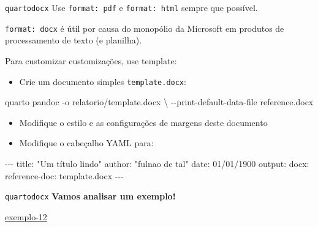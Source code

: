 \documentclass[
  10pt,
  ignorenonframetext,
]{beamer}
\newenvironment{Shaded}{\begin{snugshade}}{\end{snugshade}}
\newcommand{\AttributeTok}[1]{\textcolor[rgb]{0.40,0.45,0.13}{#1}}
\newcommand{\DataTypeTok}[1]{\textcolor[rgb]{0.68,0.00,0.00}{#1}}
\newcommand{\ExtensionTok}[1]{\textcolor[rgb]{0.00,0.23,0.31}{#1}}
\newcommand{\FunctionTok}[1]{\textcolor[rgb]{0.28,0.35,0.67}{#1}}
\newcommand{\KeywordTok}[1]{\textcolor[rgb]{0.00,0.23,0.31}{#1}}
\newcommand{\NormalTok}[1]{\textcolor[rgb]{0.00,0.23,0.31}{#1}}
\newcommand{\PreprocessorTok}[1]{\textcolor[rgb]{0.68,0.00,0.00}{#1}}
\newcommand{\StringTok}[1]{\textcolor[rgb]{0.13,0.47,0.30}{#1}}
\providecommand{\tightlist}{%
  \setlength{\itemsep}{0pt}\setlength{\parskip}{0pt}}\usepackage{longtable,booktabs,array}
\begin{document}
\begin{frame}[fragile]{\texttt{quarto}\newline \texttt{docx}}
\protect\hypertarget{quartodocx}{}
Use \texttt{format:\ pdf} e \texttt{format:\ html} sempre que possível.

\texttt{format:\ docx} é útil por causa do monopólio da Microsoft em
produtos de processamento de texto (e planilha).

Para customizar customizações, use template:

\begin{itemize}
\tightlist
\item
  Crie um documento simples \texttt{template.docx}:
\end{itemize}

\begin{Shaded}
\begin{Highlighting}[]
\ExtensionTok{quarto}\NormalTok{ pandoc }\AttributeTok{{-}o}\NormalTok{ relatorio/template.docx }\DataTypeTok{\textbackslash{}}
   \AttributeTok{{-}{-}print{-}default{-}data{-}file}\NormalTok{ reference.docx}
\end{Highlighting}
\end{Shaded}

\begin{itemize}
\tightlist
\item
  Modifique o estilo e as configurações de margens deste documento
\item
  Modifique o cabeçalho YAML para:
\end{itemize}
\end{frame}

\begin{frame}[fragile]
\begin{Shaded}
\begin{Highlighting}[]
\PreprocessorTok{{-}{-}{-}}
\FunctionTok{title}\KeywordTok{:}\AttributeTok{ }\StringTok{"Um título lindo"}
\FunctionTok{author}\KeywordTok{:}\AttributeTok{ }\StringTok{"fulnao de tal"}
\FunctionTok{date}\KeywordTok{:}\AttributeTok{ 01/01/1900}
\FunctionTok{output}\KeywordTok{:}
\AttributeTok{  }\FunctionTok{docx}\KeywordTok{:}
\AttributeTok{    }\FunctionTok{reference{-}doc}\KeywordTok{:}\AttributeTok{ template.docx}
\PreprocessorTok{{-}{-}{-}}
\end{Highlighting}
\end{Shaded}
\end{frame}

\begin{frame}{\texttt{quarto}\newline \texttt{docx}}
\protect\hypertarget{quartodocx-1}{}
\textbf{Vamos analisar um exemplo!}

\href{https://ufbabr-my.sharepoint.com/:f:/g/personal/gilberto_sassi_ufba_br/Eumpmr8uaVxBkYslMRphEdcBDSLHag5_79LwD5hBYDl-5Q?e=5WG8A4}{exemplo-12}
\end{frame}
\end{document}
